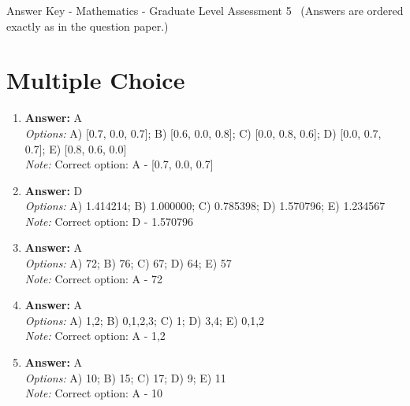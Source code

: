 \documentclass[12pt]{article}
\begin{document}
\begin{center}
Answer Key - Mathematics - Graduate Level Assessment 5 \
\small (Answers are ordered exactly as in the question paper.)
\end{center}

\section*{Multiple Choice}
\begin{enumerate}[label=\arabic*.]
\item \textbf{Answer:} A
\\ \textit{Options:} A) [0.7, 0.0, 0.7]; B) [0.6, 0.0, 0.8]; C) [0.0, 0.8, 0.6]; D) [0.0, 0.7, 0.7]; E) [0.8, 0.6, 0.0]
\\ \textit{Note:} Correct option: A - [0.7, 0.0, 0.7]
\item \textbf{Answer:} D
\\ \textit{Options:} A) 1.414214; B) 1.000000; C) 0.785398; D) 1.570796; E) 1.234567
\\ \textit{Note:} Correct option: D - 1.570796
\item \textbf{Answer:} A
\\ \textit{Options:} A) 72; B) 76; C) 67; D) 64; E) 57
\\ \textit{Note:} Correct option: A - 72
\item \textbf{Answer:} A
\\ \textit{Options:} A) 1,2; B) 0,1,2,3; C) 1; D) 3,4; E) 0,1,2
\\ \textit{Note:} Correct option: A - 1,2
\item \textbf{Answer:} A
\\ \textit{Options:} A) 10; B) 15; C) 17; D) 9; E) 11
\\ \textit{Note:} Correct option: A - 10
\end{enumerate}
\end{document}
